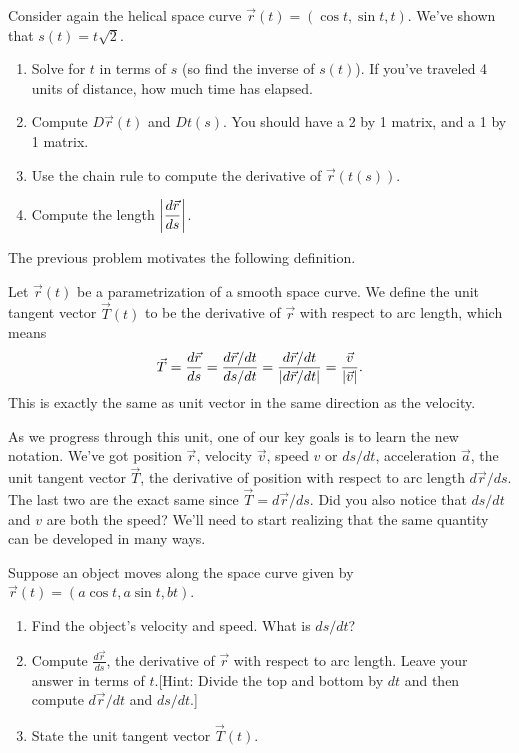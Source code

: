 \begin{problem}
Consider again the helical space curve $\vec r(t)=(\cos t, \sin t, t)$.  We've shown that $s(t) = t\sqrt{2}$. 
\begin{enumerate}
 \item Solve for $t$ in terms of $s$ (so find the inverse of $s(t)$). If you've traveled 4 units of distance, how much time has elapsed.   
 \item Compute $D\vec r(t)$ and $Dt(s)$.  You should have a 2 by 1 matrix, and a 1 by 1 matrix. 
 \item Use the chain rule to compute the derivative of $\vec r(t(s))$.
 \item Compute the length $\left|\displaystyle\frac{d\vec r}{ds}\right|$.
\end{enumerate}
\end{problem}

The previous problem motivates the following definition.

\begin{definition}\label{def unit tangent vector}
 Let $\vec r(t)$ be a parametrization of a smooth space curve. We define the unit tangent vector $\vec T(t)$ to be the derivative of $\vec r$ with respect to arc length, which means
$$\vec T = \displaystyle\frac{d\vec r}{ds}=\displaystyle\frac{d\vec r/dt}{ds/dt} = \frac{d\vec r/dt}{|d \vec r/dt|} = \frac{\vec v}{|\vec v|}.$$
This is exactly the same as unit vector in the same direction as the velocity.
\end{definition}

As we progress through this unit, one of our key goals is to learn the new notation.  We've got position $\vec r$,  velocity $\vec v$, speed $v$ or $ds/dt$, acceleration $\vec a$, the unit tangent vector $\vec T$, the derivative of position with respect to arc length $d\vec r/ds$.  The last two are the exact same since $\vec T = d\vec r/ds$. Did you also notice that $ds/dt$ and $v$ are both the speed?  We'll need to start realizing that the same quantity can be developed in many ways. 

\begin{problem}
%
 Suppose an object moves along the space curve given by  $\vec r(t)=(a\cos t,a\sin t,b t)$. 
\begin{enumerate}
 \item Find the object's velocity and speed. What is $ds/dt$?
 \item Compute $\frac{d\vec r}{ds}$, the derivative of $\vec r$ with respect to arc length. Leave your answer in terms of $t$.[Hint: Divide the top and bottom by $dt$ and then compute $d\vec r/dt$ and $ds/dt$.]  
 \item State the unit tangent vector $\vec T(t)$.
\end{enumerate}
\end{problem}

